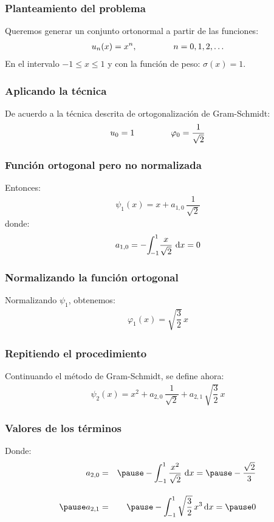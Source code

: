 \documentclass[12pt]{beamer}
\begin{document}
\begin{frame}
\frametitle{Planteamiento del problema}
Queremos generar un conjunto ortonormal a partir de las funciones:
\pause
\begin{align*}
u_{n} (x) = x^{n}, \hspace{1.5cm} n = 0, 1, 2, \ldots
\end{align*}
En el intervalo $-1 \leq x \leq 1$ y con la función de peso: $\sigma (x) = 1$.
\end{frame}
\begin{frame}
\frametitle{Aplicando la técnica}
De acuerdo a la técnica descrita de ortogonalización de Gram-Schmidt:
\pause
\begin{align}
u_{0} = 1 \hspace{1.5cm} \varphi_{0} =  \dfrac{1}{\sqrt{2}}
\label{eq:ecuacion_10_50}
\end{align}
\end{frame}
\begin{frame}
\frametitle{Función ortogonal pero no normalizada}
Entonces:
\pause
\begin{align}
\psi_{1} (x) = x + a_{1,0} \, \dfrac{1}{\sqrt{2}}
\label{eq:ecuacion_10_51}
\end{align}
\pause
donde:
\begin{align}
a_{1, 0} = - \scaleint{5ex}_{\bs -1}^{1} \dfrac{x}{\sqrt{2}} \, \dd{x} = 0
\label{eq:ecuacion_10_52}
\end{align}
\end{frame}
\begin{frame}
\frametitle{Normalizando la función ortogonal}
Normalizando $\psi_{1}$, obtenemos:
\pause
\begin{align}
\varphi_{1} (x) = \sqrt{\dfrac{3}{2}} \, x
\label{eq:ecuacion_10_53}
\end{align}
\end{frame}
\begin{frame}
\frametitle{Repitiendo el procedimiento}
Continuando el método de Gram-Schmidt, se define ahora:
\pause
\begin{align}
\psi_{2} (x) = x^{2} +  a_{2, 0} \, \dfrac{1}{\sqrt{2}} +  a_{2, 1} \, \sqrt{\dfrac{3}{2}} \, x
\label{eq:ecuacion_10_54}
\end{align}
\end{frame}
\begin{frame}
\frametitle{Valores de los términos}
Donde:
\pause
\begin{eqnarray}
a_{2, 0} &=& \pause - \scaleint{5ex}_{\bs -1}^{1} \, \dfrac{x^{2}}{\sqrt{2}} \, \dd{x} = \pause - \dfrac{\sqrt{2}}{3} \label{eq:ecuacion_10_55} \\[1em] \pause
a_{2, 1} &=& \pause - \scaleint{5ex}_{\bs -1}^{1} \, \sqrt{\dfrac{3}{2}} \, x^{3} \dd{x} = \pause 0 \label{eq:ecuacion_10_56}
\end{eqnarray}
\end{frame}
\end{document}

